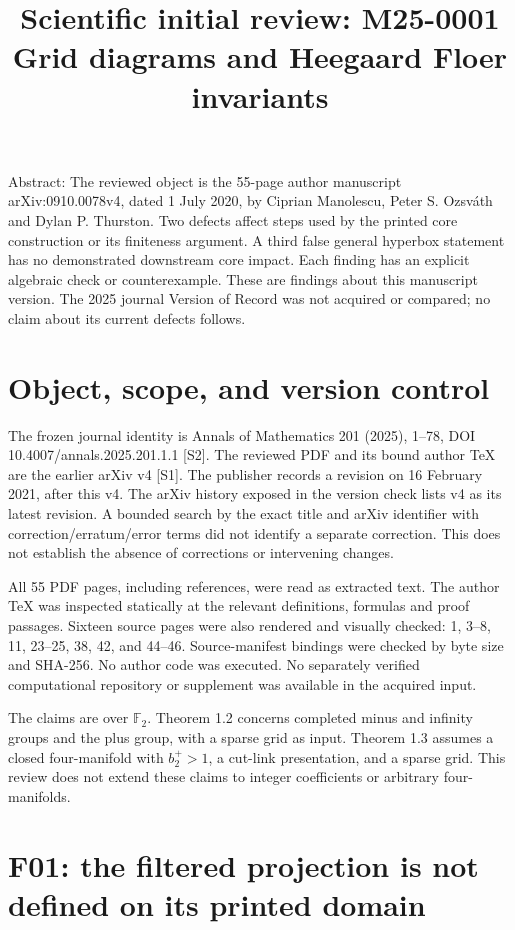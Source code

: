 \documentclass[10pt]{article}
\title{Scientific initial review: M25-0001
Grid diagrams and Heegaard Floer invariants}
\author{}
\date{}
\begin{document}
\maketitle
Abstract: The reviewed object is the 55-page author manuscript arXiv:0910.0078v4, dated 1 July 2020, by Ciprian Manolescu, Peter S. Ozsváth and Dylan P. Thurston. Two defects affect steps used by the printed core construction or its finiteness argument. A third false general hyperbox statement has no demonstrated downstream core impact. Each finding has an explicit algebraic check or counterexample. These are findings about this manuscript version. The 2025 journal Version of Record was not acquired or compared; no claim about its current defects follows.\par
\section*{Object, scope, and version control}
The frozen journal identity is Annals of Mathematics 201 (2025), 1–78, DOI 10.4007/annals.2025.201.1.1 [S2]. The reviewed PDF and its bound author TeX are the earlier arXiv v4 [S1]. The publisher records a revision on 16 February 2021, after this v4. The arXiv history exposed in the version check lists v4 as its latest revision. A bounded search by the exact title and arXiv identifier with correction/erratum/error terms did not identify a separate correction. This does not establish the absence of corrections or intervening changes.\par
All 55 PDF pages, including references, were read as extracted text. The author TeX was inspected statically at the relevant definitions, formulas and proof passages. Sixteen source pages were also rendered and visually checked: 1, 3–8, 11, 23–25, 38, 42, and 44–46. Source-manifest bindings were checked by byte size and SHA-256. No author code was executed. No separately verified computational repository or supplement was available in the acquired input.\par
The claims are over \(\mathbb F_2\). Theorem 1.2 concerns completed minus and infinity groups and the plus group, with a sparse grid as input. Theorem 1.3 assumes a closed four-manifold with \(b_2^+>1\), a cut-link presentation, and a sparse grid. This review does not extend these claims to integer coefficients or arbitrary four-manifolds.\par
\section*{F01: the filtered projection is not defined on its printed domain}
\end{document}
